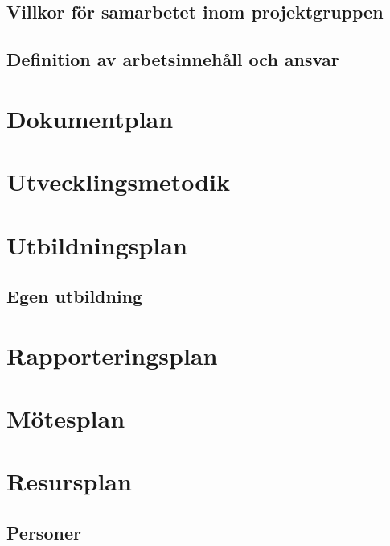\documentclass[11pt]{article}
\begin{document}
\begin{flushleft}
\subsection{Villkor för samarbetet inom projektgruppen}

\subsection{Definition av arbetsinnehåll och ansvar}

\pagebreak

\section{Dokumentplan}

\pagebreak

\section{Utvecklingsmetodik}

\pagebreak

\section{Utbildningsplan}

\subsection{Egen utbildning}

\pagebreak

\section{Rapporteringsplan}

\pagebreak

\section{Mötesplan}

\pagebreak

\section{Resursplan}

\subsection{Personer}


\end{flushleft}
\end{document}
